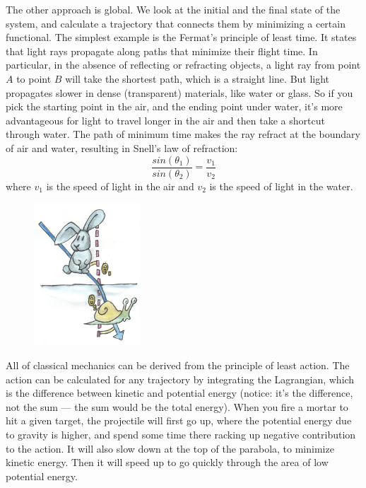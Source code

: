 The other approach is global. We look at the initial and the final state
of the system, and calculate a trajectory that connects them by
minimizing a certain functional. The simplest example is the Fermat's
principle of least time. It states that light rays propagate along paths
that minimize their flight time. In particular, in the absence of
reflecting or refracting objects, a light ray from point $A$ to point $B$
will take the shortest path, which is a straight line. But light
propagates slower in dense (transparent) materials, like water or glass.
So if you pick the starting point in the air, and the ending point under
water, it's more advantageous for light to travel longer in the air and
then take a shortcut through water. The path of minimum time makes the
ray refract at the boundary of air and water, resulting in Snell's law
of refraction:
\begin{equation*}
\frac{sin(\theta_1)}{sin(\theta_2)} = \frac{v_1}{v_2}
\end{equation*}
where $v_1$ is the speed of light in the air and $v_2$ is
the speed of light in the water.

\begin{figure}[H]
\centering
\includegraphics[width=1.56250in]{images/snell.jpg}
\end{figure}

All of classical mechanics can be derived from the principle of least
action. The action can be calculated for any trajectory by integrating
the Lagrangian, which is the difference between kinetic and potential
energy (notice: it's the difference, not the sum --- the sum would be
the total energy). When you fire a mortar to hit a given target, the
projectile will first go up, where the potential energy due to gravity
is higher, and spend some time there racking up negative contribution to
the action. It will also slow down at the top of the parabola, to
minimize kinetic energy. Then it will speed up to go quickly through the
area of low potential energy.

